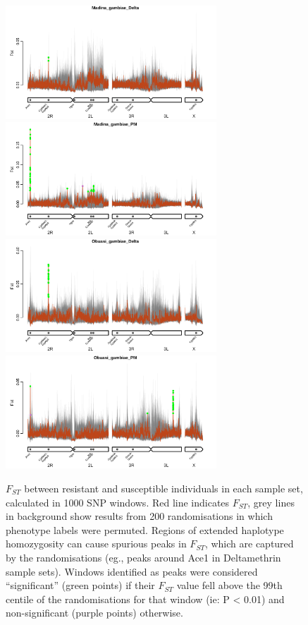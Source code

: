 \documentclass[a4paper,12pt]{article}
\begin{document}
\begin{figure}[h]
	\vskip 0.4cm
	\includegraphics*[width = 7.9cm]{../../randomisations/Fst/Madina_gambiae_Delta_peak_filter_plot.png}
	\includegraphics*[width = 7.9cm]{../../randomisations/Fst/Madina_gambiae_PM_peak_filter_plot.png}
	\vskip 0.4cm
	\includegraphics*[width = 7.9cm]{../../randomisations/Fst/Obuasi_gambiae_Delta_peak_filter_plot.png}
	\includegraphics*[width = 7.9cm]{../../randomisations/Fst/Obuasi_gambiae_PM_peak_filter_plot.png}
	\caption{\footnotesize $F_{ST}$ between resistant and susceptible individuals in each sample set, calculated in 1000 SNP windows. Red line indicates $F_{ST}$, grey lines in background show results from 200 randomisations in which phenotype labels were permuted. Regions of extended haplotype homozygosity can cause spurious peaks in $F_{ST}$, which are captured by the randomisations (eg., peaks around Ace1 in Deltamethrin sample sets). Windows identified as peaks were considered ``significant'' (green points) if their $F_{ST}$ value fell above the 99th centile of the randomisations for that window (ie: P < 0.01) and non-significant (purple points) otherwise.}
	\label{FigS2}
\end{figure}
\end{document}
